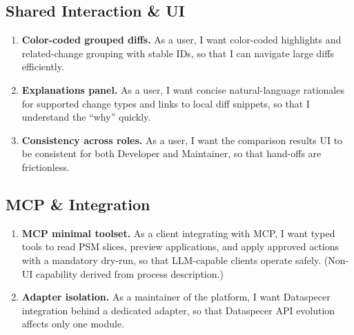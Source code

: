 \subsection*{Shared Interaction \& UI}
\begin{enumerate}
  \item \textbf{Color-coded grouped diffs.} As a user, I want color-coded highlights and related-change grouping with stable IDs, so that I can navigate large diffs efficiently. 
  \item \textbf{Explanations panel.} As a user, I want concise natural-language rationales for supported change types and links to local diff snippets, so that I understand the “why” quickly. 
  \item \textbf{Consistency across roles.} As a user, I want the comparison results UI to be consistent for both Developer and Maintainer, so that hand-offs are frictionless. 
\end{enumerate}

\subsection*{MCP \& Integration}
\begin{enumerate}
  \item \textbf{MCP minimal toolset.} As a client integrating with MCP, I want typed tools to read PSM slices, preview applications, and apply approved actions with a mandatory dry-run, so that LLM-capable clients operate safely. (Non-UI capability derived from process description.) 
  \item \textbf{Adapter isolation.} As a maintainer of the platform, I want Dataspecer integration behind a dedicated adapter, so that Dataspecer API evolution affects only one module. 
\end{enumerate}

